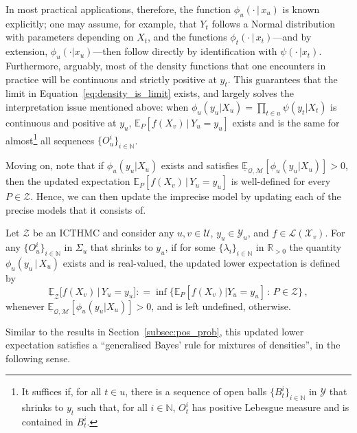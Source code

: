 \documentclass[twoside,11pt]{article}
\newcommand{\nats}{\mathbb{N}}
\newcommand{\reals}{\mathbb{R}}
\newcommand{\realspos}{\reals_{>0}}
\newcommand{\states}{\mathcal{X}}
\newcommand{\observs}{\mathcal{Y}}
\newcommand{\lexp}{\underline{\mathbb{E}}_{\rateset,\mathcal{M}}}
\newcommand{\gambles}{\mathcal{L}}
\newcommand{\rateset}{\mathcal{Q}}
\newcommand{\coloneqq}{:\!=}
\begin{document}
In most practical applications, therefore, the function $\phi_u(\cdot\,\vert\,x_u)$ is known explicitly; one may assume, for example, that $Y_t$ follows a Normal distribution with parameters depending on $X_t$, and the functions $\phi_t(\cdot\,\vert\,x_t)$---and by extension, $\phi_u(\cdot\vert x_u)$---then follow directly by identification with $\psi(\cdot\,\vert x_t)$. Furthermore, arguably, most of the density functions that one encounters in practice will be continuous and strictly positive at $y_t$. This guarantees that the limit in Equation~\eqref{eq:density_is_limit} exists, and largely solves the interpretation issue mentioned above: when $\phi_u(y_u\vert X_u)=\prod_{t\in u}\psi(y_t\vert X_t)$ is continuous and positive at $y_u$, $\mathbb{E}_P[f(X_v)\,\vert\,Y_u=y_u]$ exists and is the same for almost\footnote{\label{fnote:limit_required_properties}
It suffices if, for all $t\in u$, there is a sequence of open balls $\{B_t^i\}_{i\in\nats}$ in $\observs$ that shrinks to $y_t$ such that, for all $i\in\nats$, $O_t^i$ has positive Lebesgue measure and is contained in $B_t^i$.} all sequences $\{O_u^i\}_{i\in\nats}$. 


Moving on, note that if $\phi_u(y_u\vert X_u)$ exists and satisfies $\lexp[\phi_u(y_u\vert X_u)]>0$, then the updated expectation $\mathbb{E}_P[f(X_v)\,\vert\,Y_u=y_u]$ is well-defined for every $P\in\mathcal{Z}$. Hence, we can then update the imprecise model by updating each of the precise models that it consists of.
\begin{definition}\label{def:reg_ext_densities}
Let $\mathcal{Z}$ be an ICTHMC and consider any $u,v\in\mathcal{U}$, $y_u\in\observs_u$, and $f\in\gambles(\states_v)$. For any $\{O_u^i\}_{i\in\nats}$ in $\Sigma_u$ that shrinks to $y_u$, if for some $\{\lambda_i\}_{i\in\nats}$ in $\realspos$ the quantity $\phi_u(y_u\,\vert\,X_u)$ exists and is real-valued, the updated lower expectation is defined by
\begin{equation*}
\underline{\mathbb{E}}_{\mathcal{Z}}\bigl[f(X_v)\,\vert\,Y_u = y_u\bigr] \coloneqq \inf\{\mathbb{E}_P[f(X_v)\vert Y_u=y_u]\,:\,P\in\mathcal{Z}\}\,,
\end{equation*}
whenever $\lexp[\phi_u(y_u\vert X_u)] >0$, and is left undefined, otherwise.
\end{definition}

Similar to the results in Section~\ref{subsec:pos_prob}, this updated lower expectation satisfies a ``generalised Bayes' rule for mixtures of densities'', in the following sense.
\end{document}
